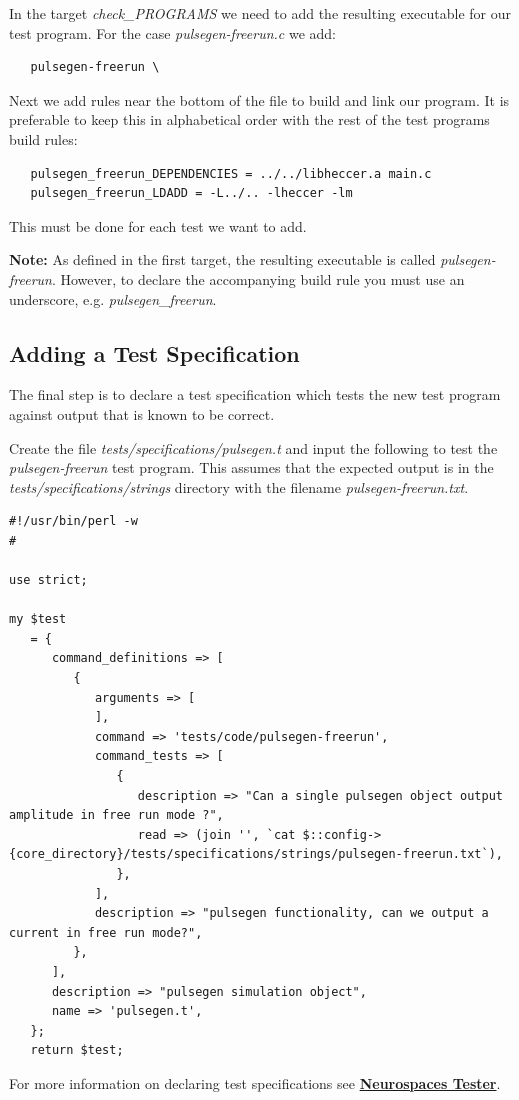 \documentclass[12pt]{article}
\begin{document}
In the target {\it check\_PROGRAMS} we need to add the resulting executable for our test program. For the case {\it pulsegen-freerun.c} we add:
\begin{verbatim}
   pulsegen-freerun \
\end{verbatim}
Next we add rules near the bottom of the file to build and link our program. It is preferable to keep this in alphabetical order with the rest of the test programs build rules:
\begin{verbatim}
   pulsegen_freerun_DEPENDENCIES = ../../libheccer.a main.c
   pulsegen_freerun_LDADD = -L../.. -lheccer -lm
\end{verbatim}
This must be done for each test we want to add.

{\bf Note:} As defined in the first target, the resulting executable is called {\it pulsegen-freerun}. However, to declare the accompanying build rule you must use an underscore, e.g. {\it pulsegen\_freerun}.

\subsection*{Adding a Test Specification}

The final step is to declare a test specification which tests the new test program against output that is known to be correct.

Create the file {\it tests/specifications/pulsegen.t} and input the following to test the {\it pulsegen-freerun} test program. This assumes that the expected output is in the {\it tests/specifications/strings} directory with the filename {\it pulsegen-freerun.txt}.
\begin{verbatim}
#!/usr/bin/perl -w
#

use strict;

my $test
   = {
      command_definitions => [
         {
            arguments => [
            ],
            command => 'tests/code/pulsegen-freerun',
            command_tests => [
               {
                  description => "Can a single pulsegen object output amplitude in free run mode ?",
                  read => (join '', `cat $::config->{core_directory}/tests/specifications/strings/pulsegen-freerun.txt`),
               },
            ],
            description => "pulsegen functionality, can we output a current in free run mode?",
         },
      ],
      description => "pulsegen simulation object",
      name => 'pulsegen.t',
   };
   return $test;
\end{verbatim}
For more information on declaring test specifications see \href{../neurospaces-tester/neurospaces-tester.tex}{\bf Neurospaces Tester}.
 
\end{document}
